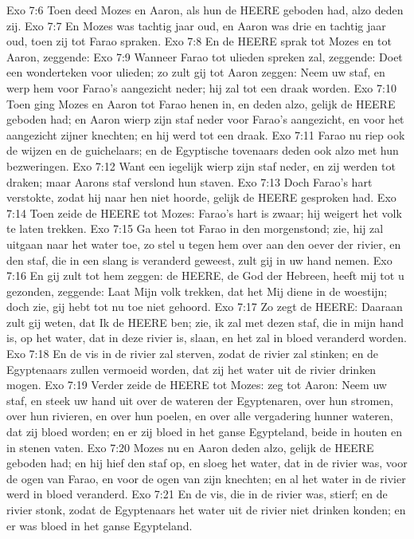 Exo 7:6  Toen deed Mozes en Aaron, als hun de HEERE geboden had, alzo deden zij.
Exo 7:7  En Mozes was tachtig jaar oud, en Aaron was drie en tachtig jaar oud, toen zij tot Farao spraken.
Exo 7:8  En de HEERE sprak tot Mozes en tot Aaron, zeggende:
Exo 7:9  Wanneer Farao tot ulieden spreken zal, zeggende: Doet een wonderteken voor ulieden; zo zult gij tot Aaron zeggen: Neem uw staf, en werp hem voor Farao's aangezicht neder; hij zal tot een draak worden.
Exo 7:10  Toen ging Mozes en Aaron tot Farao henen in, en deden alzo, gelijk de HEERE geboden had; en Aaron wierp zijn staf neder voor Farao's aangezicht, en voor het aangezicht zijner knechten; en hij werd tot een draak.
Exo 7:11  Farao nu riep ook de wijzen en de guichelaars; en de Egyptische tovenaars deden ook alzo met hun bezweringen.
Exo 7:12  Want een iegelijk wierp zijn staf neder, en zij werden tot draken; maar Aarons staf verslond hun staven.
Exo 7:13  Doch Farao's hart verstokte, zodat hij naar hen niet hoorde, gelijk de HEERE gesproken had.
Exo 7:14  Toen zeide de HEERE tot Mozes: Farao's hart is zwaar; hij weigert het volk te laten trekken.
Exo 7:15  Ga heen tot Farao in den morgenstond; zie, hij zal uitgaan naar het water toe, zo stel u tegen hem over aan den oever der rivier, en den staf, die in een slang is veranderd geweest, zult gij in uw hand nemen.
Exo 7:16  En gij zult tot hem zeggen: de HEERE, de God der Hebreen, heeft mij tot u gezonden, zeggende: Laat Mijn volk trekken, dat het Mij diene in de woestijn; doch zie, gij hebt tot nu toe niet gehoord.
Exo 7:17  Zo zegt de HEERE: Daaraan zult gij weten, dat Ik de HEERE ben; zie, ik zal met dezen staf, die in mijn hand is, op het water, dat in deze rivier is, slaan, en het zal in bloed veranderd worden.
Exo 7:18  En de vis in de rivier zal sterven, zodat de rivier zal stinken; en de Egyptenaars zullen vermoeid worden, dat zij het water uit de rivier drinken mogen.
Exo 7:19  Verder zeide de HEERE tot Mozes: zeg tot Aaron: Neem uw staf, en steek uw hand uit over de wateren der Egyptenaren, over hun stromen, over hun rivieren, en over hun poelen, en over alle vergadering hunner wateren, dat zij bloed worden; en er zij bloed in het ganse Egypteland, beide in houten en in stenen vaten.
Exo 7:20  Mozes nu en Aaron deden alzo, gelijk de HEERE geboden had; en hij hief den staf op, en sloeg het water, dat in de rivier was, voor de ogen van Farao, en voor de ogen van zijn knechten; en al het water in de rivier werd in bloed veranderd.
Exo 7:21  En de vis, die in de rivier was, stierf; en de rivier stonk, zodat de Egyptenaars het water uit de rivier niet drinken konden; en er was bloed in het ganse Egypteland.
